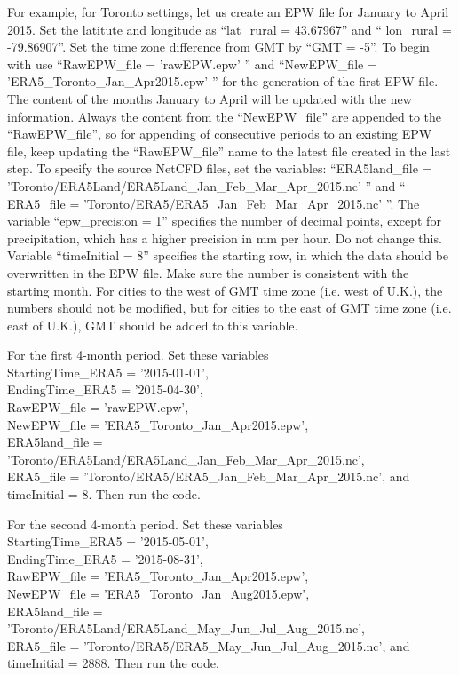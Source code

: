 \documentclass[12pt]{article}
\begin{document}
For example, for Toronto settings, let us create an EPW file for January to April 2015. Set the latitute and longitude as ``lat\_rural = 43.67967'' and ``
lon\_rural = -79.86907''. Set the time zone difference from GMT by ``GMT = -5''. To begin with use ``RawEPW\_file = 'rawEPW.epw' '' and ``NewEPW\_file = 'ERA5\_Toronto\_Jan\_Apr2015.epw' '' for the generation of the first EPW file. The content of the months January to April will be updated with the new information. Always the content from the ``NewEPW\_file'' are appended to the ``RawEPW\_file'', so for appending of consecutive periods to an existing EPW file, 
keep updating the ``RawEPW\_file'' name to the latest file created in the last step. To specify the source NetCFD files, set the variables: ``ERA5land\_file = 'Toronto/ERA5Land/ERA5Land\_Jan\_Feb\_Mar\_Apr\_2015.nc' '' and ``
ERA5\_file = 'Toronto/ERA5/ERA5\_Jan\_Feb\_Mar\_Apr\_2015.nc' ''. The variable ``epw\_precision = 1'' specifies the number of decimal points, except for precipitation, which has a higher precision in mm per hour. Do not change this. Variable ``timeInitial = 8'' specifies the starting row, in which the data should be overwritten in the EPW file. Make sure the number is consistent with the starting month. For cities to the west of GMT time zone (i.e. west of U.K.), the numbers should not be modified, but for cities to the east of GMT time zone (i.e. east of U.K.), GMT should be added to this variable.

For the first 4-month period. Set these variables \\
StartingTime\_ERA5 = '2015-01-01', \\
EndingTime\_ERA5 = '2015-04-30', \\
RawEPW\_file = 'rawEPW.epw', \\
NewEPW\_file = 'ERA5\_Toronto\_Jan\_Apr2015.epw', \\ 
ERA5land\_file = 'Toronto/ERA5Land/ERA5Land\_Jan\_Feb\_Mar\_Apr\_2015.nc', \\ 
ERA5\_file = 'Toronto/ERA5/ERA5\_Jan\_Feb\_Mar\_Apr\_2015.nc', and \\
timeInitial = 8. Then run the code.

For the second 4-month period. Set these variables \\
StartingTime\_ERA5 = '2015-05-01', \\
EndingTime\_ERA5 = '2015-08-31', \\
RawEPW\_file = 'ERA5\_Toronto\_Jan\_Apr2015.epw', \\
NewEPW\_file = 'ERA5\_Toronto\_Jan\_Aug2015.epw', \\ 
ERA5land\_file = 'Toronto/ERA5Land/ERA5Land\_May\_Jun\_Jul\_Aug\_2015.nc', \\ 
ERA5\_file = 'Toronto/ERA5/ERA5\_May\_Jun\_Jul\_Aug\_2015.nc', and \\
timeInitial = 2888. Then run the code.
\end{document}
